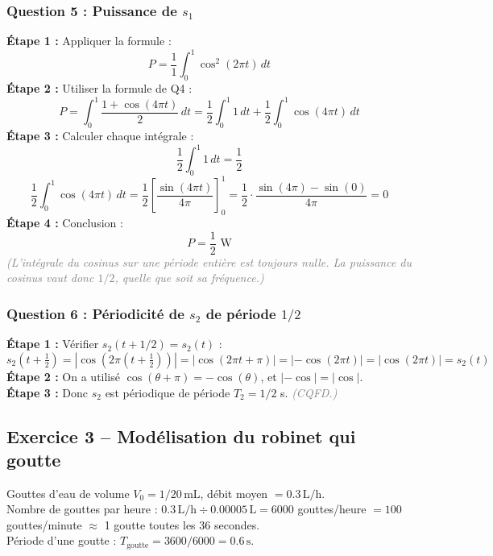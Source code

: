 \documentclass[12pt,a4paper]{article}
\newcommand{\step}[1]{\textcolor{coursbleu}{\textbf{Étape #1 :}}}
\newcommand{\explication}[1]{\textit{\textcolor{gray}{(#1)}}}
\newcommand{\encadre}[1]{\boxed{#1}}
\begin{document}
\subsubsection*{Question 5 : Puissance de $s_1$}

\begin{tcolorbox}[corrbox, title=Correction Q5]
\step{1} Appliquer la formule :
\[
  P = \frac{1}{1}\int_0^1 \cos^2(2\pi t)\,dt
\]
\step{2} Utiliser la formule de Q4 :
\[
  P = \int_0^1 \frac{1 + \cos(4\pi t)}{2}\,dt
   = \frac{1}{2}\int_0^1 1\,dt + \frac{1}{2}\int_0^1 \cos(4\pi t)\,dt
\]
\step{3} Calculer chaque intégrale :
\[
  \frac{1}{2}\int_0^1 1\,dt = \frac{1}{2}
\]
\[
  \frac{1}{2}\int_0^1 \cos(4\pi t)\,dt = \frac{1}{2}\left[\frac{\sin(4\pi t)}{4\pi}\right]_0^1
  = \frac{1}{2}\cdot\frac{\sin(4\pi)-\sin(0)}{4\pi} = 0
\]
\step{4} Conclusion :
\[
  \encadre{P = \frac{1}{2} \text{ W}}
\]
\explication{L'intégrale du cosinus sur une période entière est toujours nulle.
La puissance du cosinus vaut donc $1/2$, quelle que soit sa fréquence.}
\end{tcolorbox}

\subsubsection*{Question 6 : Périodicité de $s_2$ de période $1/2$}

\begin{tcolorbox}[corrbox, title=Correction Q6]
\step{1} Vérifier $s_2(t + 1/2) = s_2(t)$ :
\[
  s_2\!\left(t+\tfrac{1}{2}\right) = \left|\cos\!\left(2\pi\!\left(t+\tfrac{1}{2}\right)\right)\right|
  = \left|\cos(2\pi t + \pi)\right| = \left|-\cos(2\pi t)\right| = \left|\cos(2\pi t)\right| = s_2(t)
\]
\step{2} On a utilisé $\cos(\theta + \pi) = -\cos(\theta)$, et $|-\cos| = |\cos|$.\\[3pt]
\step{3} Donc $s_2$ est périodique de période $T_2 = 1/2$ s. \quad \explication{CQFD.}
\end{tcolorbox}

\subsection{Exercice 3 -- Modélisation du robinet qui goutte}

\begin{tcolorbox}[coursbox, title=Données du problème]
Gouttes d'eau de volume $V_0 = 1/20\,\text{mL}$, débit moyen $= 0.3\,\text{L/h}$.\\
Nombre de gouttes par heure : $0.3\,\text{L/h} \div 0.00005\,\text{L} = 6000$ gouttes/heure
$= 100$ gouttes/minute $\approx$ 1 goutte toutes les $36$ secondes.\\
Période d'une goutte : $T_{\text{goutte}} = 3600/6000 = 0.6\,\text{s}$.
\end{tcolorbox}
\end{document}

